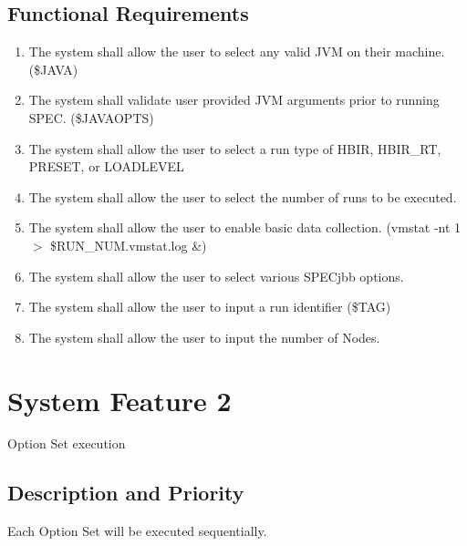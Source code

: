 \documentclass{scrreprt}
\begin{document}
\subsection{Functional Requirements}
\begin{enumerate}
	\item The system shall allow the user to select any valid JVM on their machine. (\$JAVA)
	\item The system shall validate user provided JVM arguments prior to running SPEC. (\$JAVAOPTS)
	\item The system shall allow the user to select a run type of HBIR, HBIR\_RT, PRESET, or LOADLEVEL\
	\item The system shall allow the user to select the number of runs to be executed.
	\item The system shall allow the user to enable basic data collection. (vmstat -nt 1 $>$ \$RUN\_NUM.vmstat.log \&)
	\item The system shall allow the user to select various SPECjbb options.
	\item The system shall allow the user to input a run identifier (\$TAG)
	\item The system shall allow the user to input the number of Nodes.
\end{enumerate}

\section{System Feature 2}
Option Set execution

\subsection{Description and Priority}
Each Option Set will be executed sequentially.
\end{document}
